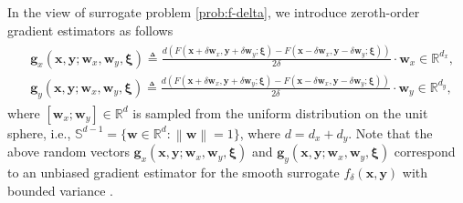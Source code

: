 \documentclass[11pt]{article}
\def\vg{\mathbf{g}}
\def\vw{\mathbf{w}}
\def\vx{\mathbf{x}}
\def\vy{\mathbf{y}}
\def\vxi{\bm{\xi}}
\def\BR{{\mathbb{R}}}
\def\BS{{\mathbb{S}}}
\newcommand{\norm}[1]{\left\| #1 \right\|}
\begin{document}
In the view of surrogate problem \eqref{prob:f-delta}, we introduce zeroth-order gradient estimators as follows \citep{yousefian2012stochastic}  
\begin{align}\label{eq:gx-gy-w-xi}
\begin{split}    
&\!\!\vg_x(\vx,\vy;\vw_x,\vw_y,\vxi)     
\triangleq \frac{d(F(\vx + \delta \vw_x,\vy+\delta \vw_y;\vxi) - F(\vx - \delta \vw_x,\vy-\delta \vw_y;\vxi))}{2\delta}
\!\cdot\! \vw_x \in\BR^{d_x}, \\
&\!\!\vg_y(\vx,\vy;\vw_x,\vw_y,\vxi) 
\triangleq \frac{d(F(\vx + \delta \vw_x,\vy+\delta \vw_y;\vxi) - F(\vx - \delta \vw_x,\vy-\delta \vw_y;\vxi))}{2\delta} \!\cdot\! \vw_y \in\BR^{d_y},
\end{split}
\end{align}
where $[\vw_x;\vw_y]\in\BR^{d}$ is sampled from the uniform distribution on the unit sphere, i.e., $\BS^{d-1}=\{\vw\in\BR^d:\norm{\vw}=1\}$, where $d=d_x+d_y$. 
Note that the above random vectors $\vg_x(\vx,\vy;\vw_x,\vw_y,\vxi)$ and $\vg_y(\vx,\vy;\vw_x,\vw_y,\vxi)$ correspond to an unbiased gradient estimator for the smooth surrogate $f_\delta(\vx,\vy)$ with bounded variance \citep{lin2022gradient}.
 
\end{document}
